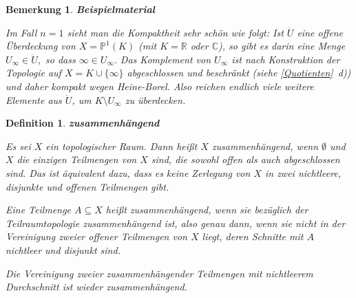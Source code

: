 \documentclass[12pt]{scrbook}   %
\newtheorem{bemX}[alles]{Bemerkung}
\newenvironment{bem}[1]{\begin{bemX}{\bf #1}\par\rm}{\end{bemX}}
\newtheorem{definiX}[alles]{Definition}
\newenvironment{defini}[1]{\begin{definiX}{\bf #1}\par\rm}{\end{definiX}}
\begin{document}
\begin{bem}{Beispielmaterial}
\begin{enumerate}[a)]
Im Fall $n=1$ sieht man die Kompaktheit sehr schön wie folgt: Ist $\ddot U$ 
eine offene Überdeckung von $X=\mathbb P^1(K)$ (mit $K=\mathbb R$ oder 
$\mathbb C$), so gibt es darin eine Menge $U_\infty\in \ddot U,$ so dass
$\infty\in U_\infty.$ Das Komplement von $U_\infty$ ist nach Konstruktion der
Topologie auf $X=K\cup\{\infty\}$ abgeschlossen und beschränkt (siehe 
\ref{Quotienten}~d)) und daher kompakt wegen Heine-Borel. Also reichen endlich viele
weitere Elemente aus $\ddot U$, um $K\setminus U_\infty$ zu überdecken.

\end{enumerate}

\end{bem}

\begin{defini}{zusammenhängend}\label{Zusammenhang} 
Es sei $X$ ein topologischer Raum. Dann heißt $X$ {\it 
zusammenhängend}, wenn $\emptyset$ und $X$ die 
einzigen Teilmengen von $X$ sind, die sowohl offen als auch abgeschlossen sind.
Das ist äquivalent dazu, dass es keine Zerlegung von $X$ in zwei nichtleere,
disjunkte und offenen Teilmengen gibt.

Eine Teilmenge $A\subseteq X$ heißt zusammenhängend, wenn sie bezüglich 
der
Teilraumtopologie zusammenhängend ist, also genau dann, wenn sie nicht 
in der Vereinigung zweier offener Teilmengen von $X$ liegt, deren Schnitte 
mit $A$ nichtleer und disjunkt sind.

Die Vereinigung zweier zusammenhängender Teilmengen mit nichtleerem
Durchschnitt ist wieder zusammenhängend.
\end{defini}
\end{document}
